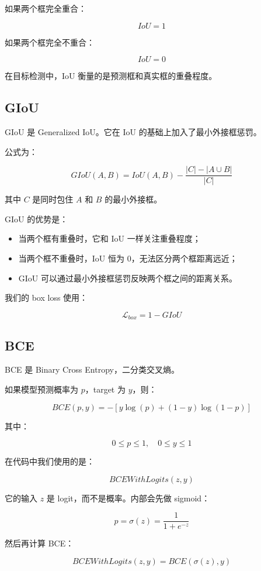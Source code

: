 \documentclass[UTF8,12pt]{ctexart}
\begin{document}
如果两个框完全重合：

\[
IoU=1
\]

如果两个框完全不重合：

\[
IoU=0
\]

在目标检测中，IoU 衡量的是预测框和真实框的重叠程度。

\subsection{GIoU}

GIoU 是 Generalized IoU。它在 IoU 的基础上加入了最小外接框惩罚。

公式为：

\[
GIoU(A,B)
=
IoU(A,B)
-
\frac{|C|-|A\cup B|}{|C|}
\]

其中 $C$ 是同时包住 $A$ 和 $B$ 的最小外接框。

GIoU 的优势是：

\begin{itemize}[leftmargin=2em]
    \item 当两个框有重叠时，它和 IoU 一样关注重叠程度；
    \item 当两个框不重叠时，IoU 恒为 0，无法区分两个框距离远近；
    \item GIoU 可以通过最小外接框惩罚反映两个框之间的距离关系。
\end{itemize}

我们的 box loss 使用：

\[
\mathcal{L}_{box}=1-GIoU
\]

\subsection{BCE}

BCE 是 Binary Cross Entropy，二分类交叉熵。

如果模型预测概率为 $p$，target 为 $y$，则：

\[
BCE(p,y)
=
-\left[
y\log(p)
+(1-y)\log(1-p)
\right]
\]

其中：

\[
0 \leq p \leq 1,\quad 0 \leq y \leq 1
\]

在代码中我们使用的是：

\[
BCEWithLogits(z,y)
\]

它的输入 $z$ 是 logit，而不是概率。内部会先做 sigmoid：

\[
p=\sigma(z)=\frac{1}{1+e^{-z}}
\]

然后再计算 BCE：

\[
BCEWithLogits(z,y)
=
BCE(\sigma(z),y)
\]
\end{document}
